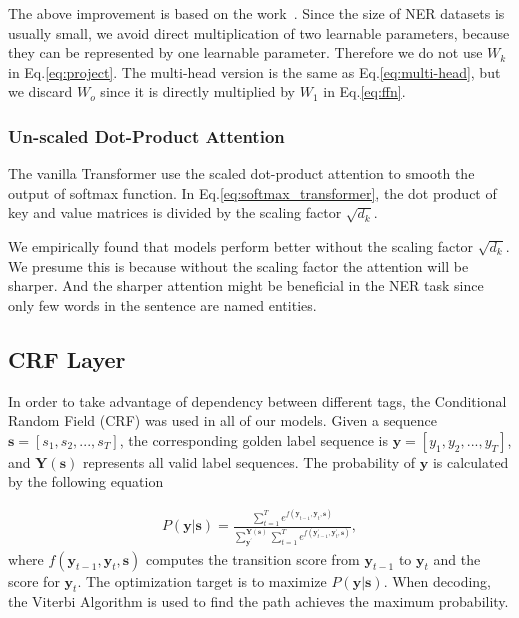 \documentclass[11pt,a4paper]{article}
\begin{document}
The above improvement is based on the work~\citep{DBLP:conf/naacl/ShawUV18,DBLP:conf/acl/DaiYYCLS19}.
Since the size of NER datasets is usually small, we avoid direct multiplication of two learnable parameters, because they can be represented by one learnable parameter. Therefore we do not use $W_k$ in Eq.\eqref{eq:project}. The multi-head version is the same as Eq.\eqref{eq:multi-head}, but we discard $W_o$ since it is directly multiplied by $W_1$ in Eq.\eqref{eq:ffn}.



\subsubsection{Un-scaled Dot-Product Attention}
The vanilla Transformer use the scaled dot-product attention to smooth the output of softmax function. In Eq.\eqref{eq:softmax_transformer}, the dot product of key and value matrices is divided by the scaling factor $\sqrt{d_k}$.

We empirically found that models perform better without the scaling factor $\sqrt{d_k}$. We presume this is because without the scaling factor the attention will be sharper. And the sharper attention might be beneficial in the NER task since only few words in the sentence are named entities.


\subsection{CRF Layer}
In order to take advantage of dependency between different tags, the Conditional Random Field (CRF) was used in all of our models. Given a sequence $\mathbf{s}=[s_1, s_2, ..., s_T]$, the corresponding golden label sequence is $\mathbf{y}=[y_1, y_2, ..., y_T]$, and $\mathbf{Y}(\mathbf{s})$ represents all valid label sequences. The probability of $\mathbf{y}$ is calculated by the following equation

\vspace{-1em}
{\small
\begin{align}
  P(\mathbf{y}|\mathbf{s}) = \frac{\sum_{t=1}^{T}e^{f(\mathbf{y}_{t-1},\mathbf{y}_t,\mathbf{s})}}
  {\sum_{\mathbf{y}^{\prime}}^{\mathbf{Y}(\mathbf{s})}\sum_{t=1}^{T}e^{f(\mathbf{y}_{t-1}^{\prime},\mathbf{y}_t^{\prime},\mathbf{s})}},
\end{align}}where $f(\mathbf{y}_{t-1},\mathbf{y}_t,\mathbf{s})$ computes the transition score from $\mathbf{y}_{t-1}$ to $\mathbf{y}_t$ and the score for $\mathbf{y}_t$. The optimization target is to maximize $P(\mathbf{y}|\mathbf{s})$. When decoding, the Viterbi Algorithm is used to find the path achieves the maximum probability.
\end{document}
